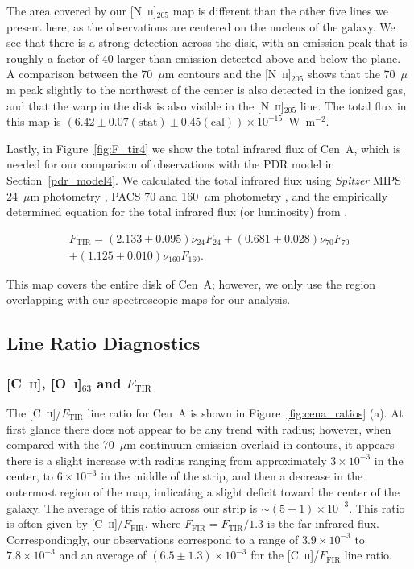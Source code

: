 The area covered by our [N~\textsc{ii}]$_{205}$ map is different than the other five lines we present here, as the observations are centered on the nucleus of the galaxy.  We see that there is a strong detection across the disk, with an emission peak that is roughly a factor of 40 larger than emission detected above and below the plane.  A comparison between the 70~$\mu$m contours and the [N~\textsc{ii}]$_{205}$ shows that the 70~$\mu$m peak slightly to the northwest of the center is also detected in the ionized gas, and that the warp in the disk is also visible in the [N~\textsc{ii}]$_{205}$ line.  The total flux in this map is $(6.42 \pm 0.07 (\mathrm{stat}) \pm 0.45 (\mathrm{cal})) \times 10^{-15}$~W~m$^{-2}$.

Lastly, in Figure~\ref{fig:F_tir4} we show the total infrared flux of Cen~A, which is needed for our comparison of observations with the PDR model in Section~\ref{pdr_model4}.  We calculated the total infrared flux using \emph{Spitzer} MIPS 24~$\mu$m photometry \citep{2012MNRAS.423..197B}, PACS 70 and 160~$\mu$m photometry \citep{2012MNRAS.422.2291P}, and the empirically determined equation for the total infrared flux (or luminosity) from \citet{2013MNRAS.431.1956G},

\begin{eqnarray}\label{eqn:Ftir4}
F_{\mathrm{TIR}} = (2.133 \pm 0.095)\nu_{24} F_{24} + (0.681 \pm 0.028)\nu_{70} F_{70}
	\nonumber \\
	+ (1.125 \pm 0.010) \nu_{160} F_{160}.
\end{eqnarray}

This map covers the entire disk of Cen~A; however, we only use the region overlapping with our spectroscopic maps for our analysis.

\subsection{Line Ratio Diagnostics}\label{ratio4}
\subsubsection{[C~\textsc{ii}], [O~\textsc{i}]$_{63}$ and $F_{\mathrm{TIR}}$}
The [C~\textsc{ii}]/$F_{\mathrm{TIR}}$ line ratio for Cen~A is shown in Figure~\ref{fig:cena_ratios} (a).  At first glance there does not appear to be any trend with radius; however, when compared with the 70~$\mu$m continuum emission overlaid in contours, it appears there is a slight increase with radius ranging from approximately $3 \times 10^{-3}$ in the center, to $6 \times 10^{-3}$ in the middle of the strip, and then a decrease in the outermost region of the map, indicating a slight deficit toward the center of the galaxy.  The average of this ratio across our strip is $\sim (5 \pm 1) \times 10^{-3}$.  This ratio is often given by  [C~\textsc{ii}]/$F_{\mathrm{FIR}}$, where $F_{\mathrm{FIR}} = F_{\mathrm{TIR}}/1.3$ \citep{2008A&A...479..703G} is the far-infrared flux.  Correspondingly, our observations correspond to a range of $3.9 \times 10^{-3}$ to $7.8 \times 10^{-3}$ and an average of $(6.5 \pm 1.3)\times 10^{-3}$ for the [C~\textsc{ii}]/$F_{\mathrm{FIR}}$ line ratio.


